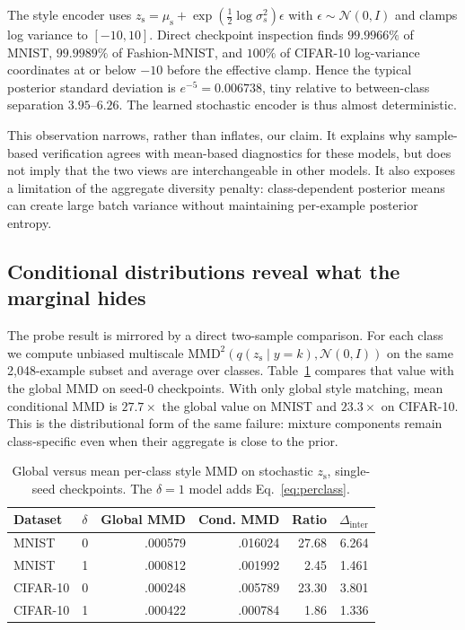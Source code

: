 \documentclass{article}
\newcommand{\zs}{z_{\mathrm{s}}}
\newcommand{\mus}{\mu_{\mathrm{s}}}
\newcommand{\MMD}{\mathrm{MMD}}
\newcommand{\Dinter}{\Delta_{\mathrm{inter}}}
\begin{document}
The style encoder uses
$\zs=\mus+\exp(\tfrac12\log\sigma_s^2)\epsilon$ with
$\epsilon\sim\mathcal N(0,I)$ and clamps log variance to $[-10,10]$.
Direct checkpoint inspection finds $99.9966\%$ of MNIST, $99.9989\%$ of
Fashion-MNIST, and $100\%$ of CIFAR-10 log-variance coordinates at or below
$-10$ before the effective clamp.  Hence the typical posterior standard
deviation is $e^{-5}=0.006738$, tiny relative to between-class separation
$3.95$--$6.26$.  The learned stochastic encoder is thus almost deterministic.

This observation narrows, rather than inflates, our claim.  It explains why
sample-based verification agrees with mean-based diagnostics for these
models, but does not imply that the two views are interchangeable in other
models.  It also exposes a limitation of the aggregate diversity penalty:
class-dependent posterior means can create large batch variance without
maintaining per-example posterior entropy.

\subsection{Conditional distributions reveal what the marginal hides}

The probe result is mirrored by a direct two-sample comparison.  For each
class we compute unbiased multiscale
$\MMD^2(q(\zs\mid y=k),\mathcal N(0,I))$ on the same 2,048-example subset and
average over classes.  Table~\ref{tab:conditional-mmd} compares that value
with the global MMD on seed-0 checkpoints.  With only global style matching,
mean conditional MMD is $27.7\times$ the global value on MNIST and
$23.3\times$ on CIFAR-10.  This is the distributional form of the same
failure: mixture components remain class-specific even when their aggregate
is close to the prior.

\begin{table}[ht]
\caption{Global versus mean per-class style MMD on stochastic $\zs$,
single-seed checkpoints.  The $\delta=1$ model adds
Eq.~\ref{eq:perclass}.}
\label{tab:conditional-mmd}
\centering
\small
\begin{tabular}{llrrrr}
\toprule
Dataset & $\delta$ & Global MMD & Cond. MMD & Ratio & $\Dinter$ \\
\midrule
MNIST & 0 & .000579 & .016024 & 27.68 & 6.264 \\
MNIST & 1 & .000812 & .001992 & 2.45 & 1.461 \\
CIFAR-10 & 0 & .000248 & .005789 & 23.30 & 3.801 \\
CIFAR-10 & 1 & .000422 & .000784 & 1.86 & 1.336 \\
\bottomrule
\end{tabular}
\end{table}
\end{document}
